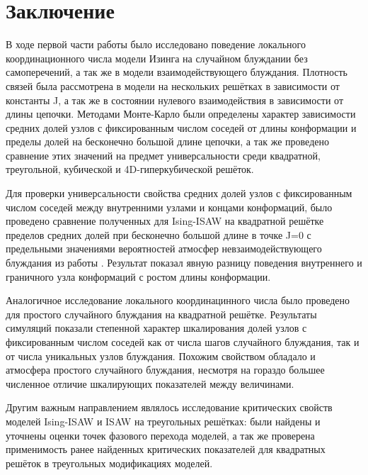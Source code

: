 \section{Заключение}

В ходе первой части работы было исследовано поведение локального координационного числа модели Изинга на случайном блуждании без самоперечений, а так же в модели взаимодействующего блуждания.
Плотность связей была рассмотрена в модели на нескольких решётках в зависимости от константы J,
а так же в состоянии нулевого взаимодействия в зависимости от длины цепочки.
Методами Монте-Карло были определены характер зависимости средних долей узлов с фиксированным числом соседей от длины конформации и пределы долей на бесконечно большой длине цепочки, а так же проведено сравнение этих значений на предмет универсальности среди квадратной, треугольной, кубической и 4D-гиперкубической решёток.

Для проверки универсальности свойства средних долей узлов с фиксированным числом соседей между внутренними узлами и концами конформаций, было проведено сравнение полученных для Ising-ISAW на квадратной решётке пределов средних долей при бесконечно большой длине в точке J=0 с предельными значениями вероятностей атмосфер невзаимодействующего блуждания из работы \cite{owczarek2008scaling}. Результат показал явную разницу поведения внутреннего и граничного узла конформаций с ростом длины конформации.

Аналогичное исследование локального координацинного числа было проведено для простого случайного блуждания на квадратной решётке.
Результаты симуляций показали степенной характер шкалирования долей узлов с фиксированным числом соседей как от числа шагов случайного блуждания, 
так и от числа уникальных узлов блуждания.
Похожим свойством обладало и атмосфера простого случайного блуждания, несмотря на гораздо большее численное отличие шкалирующих показателей между величинами.

Другим важным направлением являлось исследование критических свойств моделей Ising-ISAW и ISAW на треугольных решётках:
были найдены и уточнены оценки точек фазового перехода моделей, а так же проверена применимость ранее найденных критических показателей для квадратных решёток в треугольных модификациях моделей. 